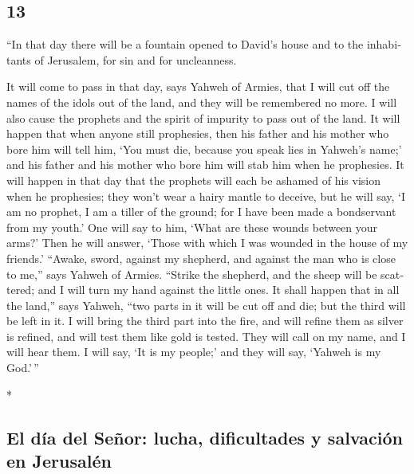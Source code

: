 \begin{paracol}{2}
\begin{otherlanguage}{english}
\hypertarget{section-25}{%
\section{13}\label{section-25}}

 ``In that day there will be a fountain opened to David's
house and to the inhabitants of Jerusalem, for sin and for uncleanness.

 It will come to pass in that day, says Yahweh of Armies,
that I will cut off the names of the idols out of the land, and they
will be remembered no more. I will also cause the prophets and the
spirit of impurity to pass out of the land.  It will
happen that when anyone still prophesies, then his father and his mother
who bore him will tell him, `You must die, because you speak lies in
Yahweh's name;' and his father and his mother who bore him will stab him
when he prophesies.  It will happen in that day that the
prophets will each be ashamed of his vision when he prophesies; they
won't wear a hairy mantle to deceive,  but he will say, `I
am no prophet, I am a tiller of the ground; for I have been made a
bondservant from my youth.'  One will say to him, `What
are these wounds between your arms?' Then he will answer, `Those with
which I was wounded in the house of my friends.'  ``Awake,
sword, against my shepherd, and against the man who is close to me,''
says Yahweh of Armies. ``Strike the shepherd, and the sheep will be
scattered; and I will turn my hand against the little ones.
 It shall happen that in all the land,'' says Yahweh,
``two parts in it will be cut off and die; but the third will be left in
it.  I will bring the third part into the fire, and will
refine them as silver is refined, and will test them like gold is
tested. They will call on my name, and I will hear them. I will say, `It
is my people;' and they will say, `Yahweh is my God.'\,''

\end{otherlanguage}

\switchcolumn[0]*

\hypertarget{el-duxeda-del-seuxf1or-lucha-dificultades-y-salvaciuxf3n-en-jerusaluxe9n}{%
\subsection{El día del Señor: lucha, dificultades y salvación en
Jerusalén}\label{el-duxeda-del-seuxf1or-lucha-dificultades-y-salvaciuxf3n-en-jerusaluxe9n}}


\end{paracol}
